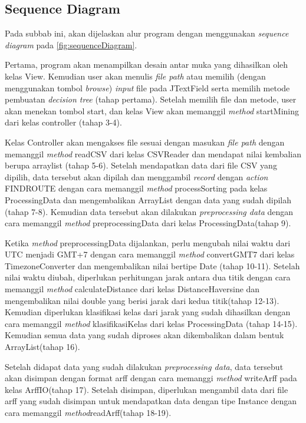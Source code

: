 \subsection{Sequence Diagram}

Pada subbab ini, akan dijelaskan alur program dengan menggunakan \textsl{sequence diagram} pada \ref{fig:sequenceDiagram}.

Pertama, program akan menampilkan desain antar muka yang dihasilkan oleh kelas View. Kemudian user akan menulis \textsl{file path} atau memilih (dengan menggunakan tombol \textsl{browse}) \textsl{input} file pada JTextField serta memilih metode pembuatan \textsl{decision tree} (tahap  pertama). Setelah memilih file dan metode, user akan menekan tombol start, dan kelas View akan memanggil \textsl{method} startMining dari kelas controller (tahap 3-4).

Kelas Controller akan mengakses file sesuai dengan masukan \textsl{file path} dengan memanggil \textsl{method} readCSV dari kelas CSVReader dan mendapat nilai kembalian berupa arraylist (tahap 5-6). Setelah mendapatkan data dari file CSV yang dipilih, data tersebut akan dipilah dan menggambil \textsl{record} dengan \textsl{action} FINDROUTE dengan cara memanggil \textsl{method} processSorting pada kelas ProcessingData dan mengembalikan ArrayList dengan data yang sudah dipilah (tahap 7-8). Kemudian data tersebut akan dilakukan \textsl{preprocessing data} dengan cara memanggil \textsl{method} preprocessingData dari kelas ProcessingData(tahap 9).

Ketika \textsl{method} preprocessingData dijalankan, perlu mengubah nilai waktu dari UTC menjadi GMT+7 dengan cara memanggil \textsl{method} convertGMT7 dari kelas TimezoneConverter dan mengembalikan nilai bertipe Date (tahap 10-11). Setelah nilai waktu diubah, diperlukan perhitungan jarak antara dua titik dengan cara memanggil \textsl{method} calculateDistance  dari kelas DistanceHaversine dan mengembalikan nilai double yang berisi jarak dari kedua titik(tahap 12-13). Kemudian diperlukan klasifikasi kelas dari jarak yang sudah dihasilkan dengan cara memanggil \textsl{method} klasifikasiKelas dari kelas ProcessingData (tahap 14-15). Kemudian semua data yang sudah diproses akan dikembalikan dalam bentuk ArrayList(tahap 16).

Setelah didapat data yang sudah dilakukan \textsl{preprocessing data}, data tersebut akan disimpan dengan format arff dengan cara memanggi \textsl{method} writeArff pada kelas ArffIO(tahap 17). Setelah disimpan, diperlukan mengambil data dari file arff yang sudah disimpan untuk mendapatkan data dengan tipe Instance dengan cara memanggil \textsl{method}readArff(tahap 18-19).

